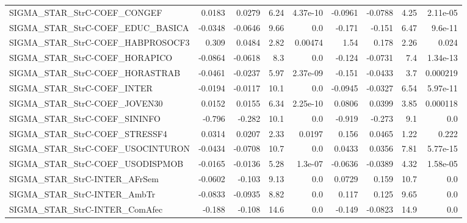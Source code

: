 \begin{tabular}{lrrrrrrrr}
SIGMA\_STAR\_StrC-COEF\_CONGEF            &      0.0183 &       0.0279 &    6.24 & 4.37e-10 &    -0.0961 &     -0.0788 &         4.25 &      2.11e-05 \\
SIGMA\_STAR\_StrC-COEF\_EDUC\_BASICA       &     -0.0348 &      -0.0646 &    9.66 &      0.0 &     -0.171 &      -0.151 &         6.47 &       9.6e-11 \\
SIGMA\_STAR\_StrC-COEF\_HABPROSOCF3       &       0.309 &       0.0484 &    2.82 &  0.00474 &       1.54 &       0.178 &         2.26 &         0.024 \\
SIGMA\_STAR\_StrC-COEF\_HORAPICO          &     -0.0864 &      -0.0618 &     8.3 &      0.0 &     -0.124 &     -0.0731 &          7.4 &      1.34e-13 \\
SIGMA\_STAR\_StrC-COEF\_HORASTRAB         &     -0.0461 &      -0.0237 &    5.97 & 2.37e-09 &     -0.151 &     -0.0433 &          3.7 &      0.000219 \\
SIGMA\_STAR\_StrC-COEF\_INTER             &     -0.0194 &      -0.0117 &    10.1 &      0.0 &    -0.0945 &     -0.0327 &         6.54 &      5.97e-11 \\
SIGMA\_STAR\_StrC-COEF\_JOVEN30           &      0.0152 &       0.0155 &    6.34 & 2.25e-10 &     0.0806 &      0.0399 &         3.85 &      0.000118 \\
SIGMA\_STAR\_StrC-COEF\_SININFO           &      -0.796 &       -0.282 &    10.1 &      0.0 &     -0.919 &      -0.273 &          9.1 &           0.0 \\
SIGMA\_STAR\_StrC-COEF\_STRESSF4          &      0.0314 &       0.0207 &    2.33 &   0.0197 &      0.156 &      0.0465 &         1.22 &         0.222 \\
SIGMA\_STAR\_StrC-COEF\_USOCINTURON       &     -0.0434 &      -0.0708 &    10.7 &      0.0 &     0.0433 &      0.0356 &         7.81 &      5.77e-15 \\
SIGMA\_STAR\_StrC-COEF\_USODISPMOB        &     -0.0165 &      -0.0136 &    5.28 &  1.3e-07 &    -0.0636 &     -0.0389 &         4.32 &      1.58e-05 \\
SIGMA\_STAR\_StrC-INTER\_AFrSem           &     -0.0602 &       -0.103 &    9.13 &      0.0 &     0.0729 &       0.159 &         10.7 &           0.0 \\
SIGMA\_STAR\_StrC-INTER\_AmbTr            &     -0.0833 &      -0.0935 &    8.82 &      0.0 &      0.117 &       0.125 &         9.65 &           0.0 \\
SIGMA\_STAR\_StrC-INTER\_ComAfec          &      -0.188 &       -0.108 &    14.6 &      0.0 &     -0.149 &     -0.0823 &         14.9 &           0.0 \\

\end{tabular}
